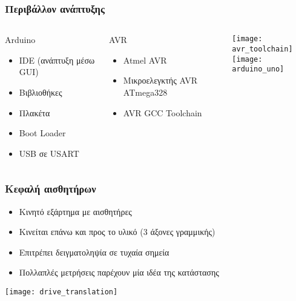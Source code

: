 \documentclass[xetex,mathserif,serif]{beamer}
\begin{document}
\begin{frame}\frametitle
    {Περιβάλλον ανάπτυξης}

    \begin{columns}[t]
        \column{5.5cm}

        \begin{block}
            {Arduino}

            \begin{itemize}
            \item IDE (ανάπτυξη μέσω GUI)
            \item Βιβλιοθήκες
            \item Πλακέτα
            \item Boot Loader
            \item USB σε USART
            \end{itemize}
        \end{block}

        \begin{block}
            {AVR}

            \begin{itemize}
            \item Atmel AVR
            \item Μικροελεγκτής AVR ATmega328
            \item AVR GCC Toolchain
            \end{itemize}
        \end{block}

        \column{6cm}

        \begin{center}
            \texttt{[image: avr\_toolchain]}\\
            \;
            \texttt{[image: arduino\_uno]}
        \end{center}
    \end{columns}
\end{frame}


\begin{frame}\frametitle
    {Κεφαλή αισθητήρων}

    \begin{itemize}
    \item Κινητό εξάρτημα με αισθητήρες
    \item Κινείται επάνω και προς το υλικό (3 άξονες γραμμικής)
    \item Επιτρέπει δειγματοληψία σε τυχαία σημεία
    \item Πολλαπλές μετρήσεις παρέχουν μία ιδέα της κατάστασης
    \end{itemize}

    \begin{center}
    \texttt{[image: drive\_translation]}
    \end{center}
\end{frame}
\end{document}
